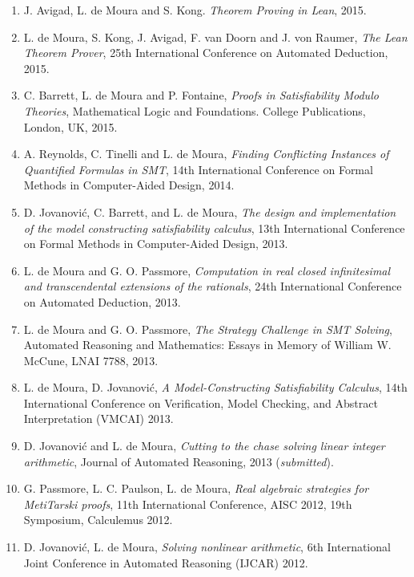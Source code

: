\documentclass{article}
\begin{document}
\begin{enumerate}
\item J. Avigad, L. de Moura and S. Kong.
      {\em Theorem Proving in Lean}, 2015.

\item L. de Moura, S. Kong, J. Avigad, F. van Doorn and J. von Raumer,
      {\em  The Lean Theorem Prover},
      25th International Conference on Automated Deduction, 2015.

\item C. Barrett, L. de Moura and P. Fontaine,
  {\em Proofs in Satisfiability Modulo Theories},
  Mathematical Logic and Foundations. College Publications, London, UK, 2015.

\item A. Reynolds, C. Tinelli and L. de Moura,
  {\em Finding Conflicting Instances of Quantified Formulas in SMT},
  14th International Conference on Formal Methods in Computer-Aided Design, 2014.

\item D. Jovanovi\'{c}, C. Barrett, and L. de Moura,
  {\em The design and implementation of the model constructing satisfiability calculus},
13th International Conference on Formal Methods in Computer-Aided Design, 2013.

\item L. de Moura and G. O. Passmore,
  {\em Computation in real closed infinitesimal and transcendental extensions of the rationals},
24th International Conference on Automated Deduction, 2013.

\item L. de Moura and G. O. Passmore,
{\em The Strategy Challenge in SMT Solving},
Automated Reasoning and Mathematics: Essays in Memory of William W. McCune,
LNAI 7788, 2013.

\item L. de Moura, D. Jovanovi\'{c},
      {\em A Model-Constructing Satisfiability Calculus},
14th International Conference on Verification, Model Checking, and Abstract Interpretation (VMCAI) 2013.

\item D. Jovanovi\'{c} and L. de Moura,
      {\em Cutting to the chase solving linear integer arithmetic},
Journal of Automated Reasoning, 2013 ({\em submitted}).

\item G. Passmore, L. C. Paulson, L. de Moura,
{\em Real algebraic strategies for MetiTarski proofs},
11th International Conference, AISC 2012, 19th Symposium, Calculemus 2012.

\item D. Jovanovi\'{c}, L. de Moura,
      {\em Solving nonlinear arithmetic},
6th International Joint Conference in Automated Reasoning (IJCAR) 2012.


\end{enumerate}
\end{document}
